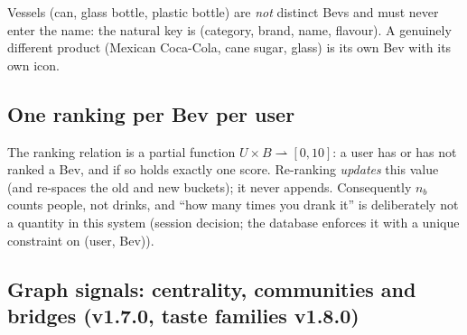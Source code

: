 \documentclass[11pt]{article}
\theoremstyle{plain}
\theoremstyle{definition}
\theoremstyle{remark}
\begin{document}
Vessels (can, glass bottle, plastic bottle) are \emph{not} distinct Bevs and must never enter the name: the natural key is (category, brand, name, flavour). A genuinely different product (Mexican Coca-Cola, cane sugar, glass) is its own Bev with its own icon.

\subsection{One ranking per Bev per user}\label{sec:binary}

The ranking relation is a partial function $U \times B \rightharpoonup [0, 10]$: a user has or has not ranked a Bev, and if so holds exactly one score. Re-ranking \emph{updates} this value (and re-spaces the old and new buckets); it never appends. Consequently $n_b$ counts people, not drinks, and ``how many times you drank it'' is deliberately not a quantity in this system (session decision; the database enforces it with a unique constraint on (user, Bev)).

\subsection{Graph signals: centrality, communities and bridges (v1.7.0, taste families v1.8.0)}\label{sec:graphsignals}
\end{document}
